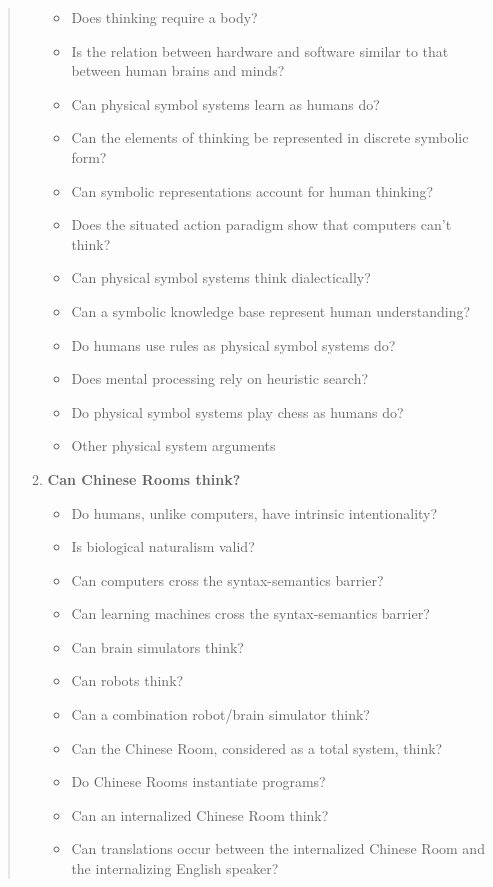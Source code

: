 \documentclass[11pt]{thesis} %
\begin{document}
\begin{quotation}
\begin{enumerate}
      \begin{itemize}
        \item Does thinking require a body?
        \item Is the relation between hardware and software similar to that between human brains and minds?
        \item Can physical symbol systems learn as humans do?
        \item Can the elements of thinking be represented in discrete symbolic form?
        \item Can symbolic representations account for human thinking?
        \item Does the situated action paradigm show that computers can't think?
        \item Can physical symbol systems think dialectically?
        \item Can a symbolic knowledge base represent human understanding?
        \item Do humans use rules as physical symbol systems do?
        \item Does mental processing rely on heuristic search?
        \item Do physical symbol systems play chess as humans do?
        \item Other physical system arguments
      \end{itemize}
    \item \textbf{Can Chinese Rooms think?}
      \begin{itemize}
        \item Do humans, unlike computers, have intrinsic intentionality?
        \item Is biological naturalism valid?
        \item Can computers cross the syntax-semantics barrier?
        \item Can learning machines cross the syntax-semantics barrier?
        \item Can brain simulators think?
        \item Can robots think?
        \item Can a combination robot/brain simulator think?
        \item Can the Chinese Room, considered as a total system, think?
        \item Do Chinese Rooms instantiate programs?
        \item Can an internalized Chinese Room think?
        \item Can translations occur between the internalized Chinese Room and the internalizing English speaker?

\end{itemize}
\end{enumerate}
\end{quotation}
\end{document}
